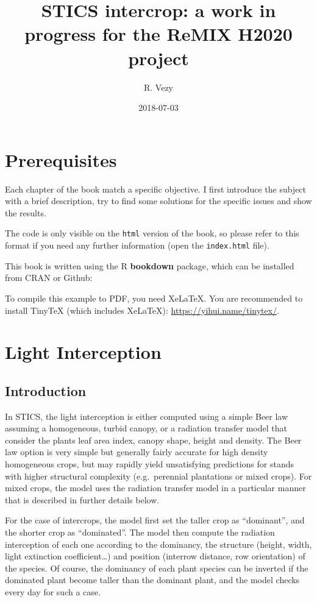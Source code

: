 \documentclass[]{book}
\title{STICS intercrop: a work in progress for the ReMIX H2020 project}
\author{R. Vezy}
\date{2018-07-03}
\theoremstyle{definition}
\theoremstyle{definition}
\theoremstyle{definition}
\theoremstyle{remark}
\begin{document}
\maketitle

{
\setcounter{tocdepth}{1}
\tableofcontents
}
\chapter{Prerequisites}\label{prerequisites}

Each chapter of the book match a specific objective. I first introduce
the subject with a brief description, try to find some solutions for the
specific issues and show the results.

The code is only visible on the \texttt{html} version of the book, so
please refer to this format if you need any further information (open
the \texttt{index.html} file).

This book is written using the R \textbf{bookdown} package, which can be
installed from CRAN or Github:

To compile this example to PDF, you need XeLaTeX. You are recommended to
install TinyTeX (which includes XeLaTeX):
\url{https://yihui.name/tinytex/}.

\chapter{Light Interception}\label{Light}

\section{Introduction}\label{introduction}

In STICS, the light interception is either computed using a simple Beer
law assuming a homogeneous, turbid canopy, or a radiation transfer model
that consider the plants leaf area index, canopy shape, height and
density. The Beer law option is very simple but generally fairly
accurate for high density homogeneous crops, but may rapidly yield
unsatisfying predictions for stands with higher structural complexity
(e.g.~perennial plantations or mixed crops). For mixed crops, the model
uses the radiation transfer model in a particular manner that is
described in further details below.

For the case of intercrops, the model first set the taller crop as
``dominant'', and the shorter crop as ``dominated''. The model then
compute the radiation interception of each one according to the
dominancy, the structure (height, width, light extinction
coefficient\ldots{}) and position (interrow distance, row orientation)
of the species. Of course, the dominancy of each plant species can be
inverted if the dominated plant become taller than the dominant plant,
and the model checks every day for such a case.
\end{document}
